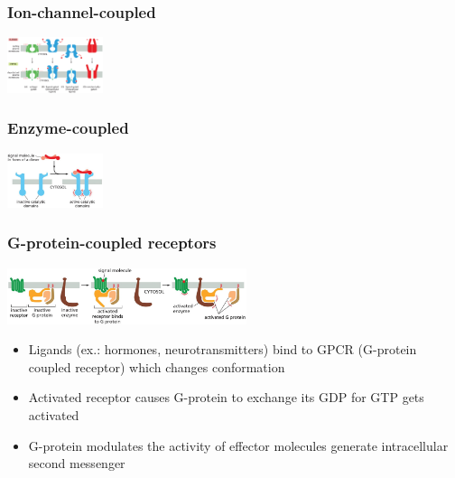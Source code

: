 \begin{minipage}{0.49\linewidth}
    \subsubsection*{Ion-channel-coupled}
        \includegraphics[width=28mm]{src/Images/ion_channel.png}
\end{minipage}
\begin{minipage}{0.49\linewidth}
\subsubsection*{Enzyme-coupled}
    \includegraphics[width=28mm]{src/Images/enzyme_coupled.png}
\end{minipage}

\subsubsection*{G-protein-coupled receptors}
\includegraphics[width=70mm]{src/Images/g_protein.png}

\begin{itemize}
    \item Ligands (ex.: hormones, neurotransmitters) bind to GPCR (G-protein coupled receptor) which changes conformation
    \item Activated receptor causes G-protein to exchange its GDP for GTP gets activated
    \item G-protein modulates the activity of effector molecules generate intracellular second messenger
\end{itemize}

